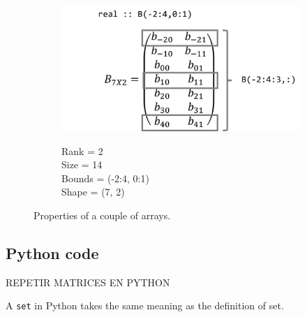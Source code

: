 \begin{itemize}
\begin{figure}
\begin{subfigure}[h]{0.5\textwidth}
            \centering
            \includegraphics[width = \textwidth]{./doc/Figures/Array3.png}  \\
            \begin{flushleft}
                Rank = 2 \\
                Size = 14 \\
                Bounds = (-2:4, 0:1) \\
                Shape = (7, 2)
            \end{flushleft}
            
        \end{subfigure}
        \caption{Properties of a couple of arrays.}   \label{fig:arrays}
    \end{figure}
    
\end{itemize}




        \newpage 
        \subsection*{Python code}



REPETIR MATRICES EN PYTHON


A \texttt{set} in Python takes the same meaning as the definition of set.











